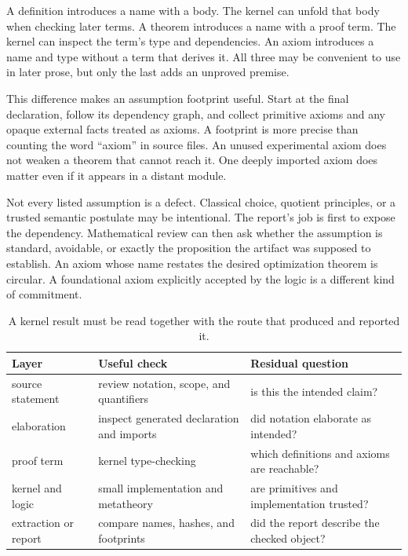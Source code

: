 A definition introduces a name with a body. The kernel can unfold that body
when checking later terms. A theorem introduces a name with a proof term. The
kernel can inspect the term's type and dependencies. An axiom introduces a
name and type without a term that derives it. All three may be convenient to
use in later prose, but only the last adds an unproved premise.

This difference makes an assumption footprint useful. Start at the final
declaration, follow its dependency graph, and collect primitive axioms and any
opaque external facts treated as axioms. A footprint is more precise than
counting the word ``axiom'' in source files. An unused experimental axiom does
not weaken a theorem that cannot reach it. One deeply imported axiom does
matter even if it appears in a distant module.

Not every listed assumption is a defect. Classical choice, quotient
principles, or a trusted semantic postulate may be intentional. The report's
job is first to expose the dependency. Mathematical review can then ask
whether the assumption is standard, avoidable, or exactly the proposition the
artifact was supposed to establish. An axiom whose name restates the desired
optimization theorem is circular. A foundational axiom explicitly accepted by
the logic is a different kind of commitment.

\begin{table}[htbp]
\centering
\caption{A kernel result must be read together with the route that produced
and reported it.}
\begin{tabular}{@{}p{}p{}p{}@{}}
\toprule
Layer & Useful check & Residual question \\
\midrule
source statement & review notation, scope, and quantifiers & is this the intended claim? \\
elaboration & inspect generated declaration and imports & did notation elaborate as intended? \\
proof term & kernel type-checking & which definitions and axioms are reachable? \\
kernel and logic & small implementation and metatheory & are primitives and implementation trusted? \\
extraction or report & compare names, hashes, and footprints & did the report describe the checked object? \\
\bottomrule
\end{tabular}
\label{tab:kernel-trust-graph}
\end{table}

